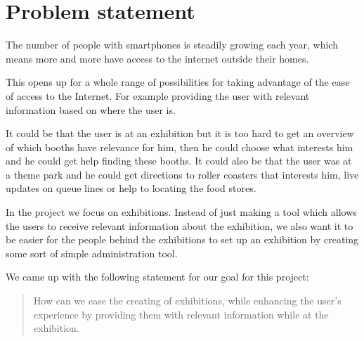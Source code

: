\section{Problem statement}\label{sec:problemstatement}

The number of people with smartphones is steadily growing each year, which means more and more have access to the internet outside their homes.

This opens up for a whole range of possibilities for taking advantage of the ease of access to the Internet. For example providing the user with relevant information based on where the user is. 

It could be that the user is at an exhibition but it is too hard to get an overview of which booths have relevance for him, then he could choose what interests him and he could get help finding these booths. It could also be that the user was at a theme park and he could get directions to roller coasters that interests him, live updates on queue lines or help to locating the food stores.

In the project we focus on exhibitions. Instead of just making a tool which allows the users to receive relevant information about the exhibition, we also want it to be easier for the people behind the exhibitions to set up an exhibition by creating some sort of simple administration tool.

We came up with the following statement for our goal for this project:

\begin{quote}
How can we ease the creating of exhibitions, while enhancing the user's experience by providing them with relevant information while at the exhibition.
\end{quote}

